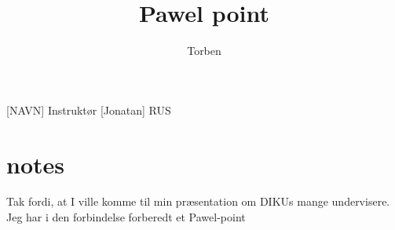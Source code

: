 \documentclass[a4paper,11pt]{article}
\title{Pawel point}
\author{Torben}
\begin{document}
\maketitle

\begin{roles}
[NAVN] Instruktør
 [Jonatan] RUS 
\end{roles}

\begin{props}
\end{props}

\section*{notes}


\begin{sketch}
 Tak fordi, at I ville komme til min præsentation om DIKUs mange undervisere. Jeg har i den forbindelse forberedt et Pawel-point


\end{sketch}
\end{document}
